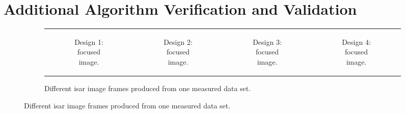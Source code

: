 \documentclass[class=report,11pt,crop=false]{standalone}
\begin{document}
\appendix
\chapter{Additional Algorithm Verification and Validation \label{apndxB}}
\begin{figure}[H]
        \begin{minipage}{0.9\linewidth}
            \begin{figure}
                \begin{tabular}{@{}cccc@{}}
                    \begin{subfigure}{0.25\linewidth}
                        \centering
                        \resizebox{\linewidth}{!}{}
                        \caption{Design 1: focused image. \label{subfig:qlp_design1_frame1}}
                    \end{subfigure}
                    &
                    \begin{subfigure}{0.25\linewidth}
                        \centering
                        \resizebox{\linewidth}{!}{}
                        \caption{Design 2: focused image. \label{subfig:qlp_design2_frame1}}
                    \end{subfigure}
                    &
                    \begin{subfigure}{0.25\linewidth}
                        \centering
                        \resizebox{\linewidth}{!}{}
                        \caption{Design 3: focused image. \label{subfig:qlp_design3_frame1}}
                    \end{subfigure}
                    &
                    \begin{subfigure}{0.25\linewidth}
                        \centering
                        \resizebox{\linewidth}{!}{}
                        \caption{Design 4: focused image. \label{subfig:qlp_design4_frame1}}
                    \end{subfigure}
                \end{tabular}
                \caption{Different \gls{isar} image frames produced from one measured data set. \label{fig:qlp_design_frame1}}
            \end{figure}
        \end{minipage}
    \end{figure}
\end{document}

